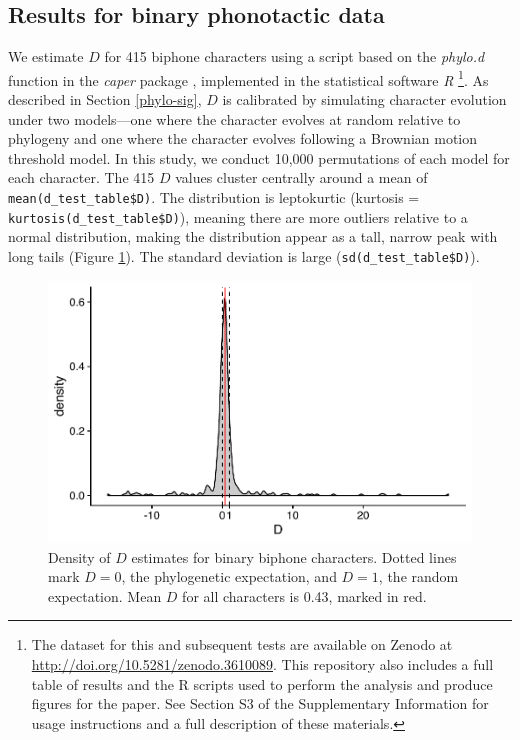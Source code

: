 \hypertarget{phy-sig-bin-results}{%
\subsection{Results for binary phonotactic data}\label{phy-sig-bin-results}}

We estimate \(D\) for 415 biphone characters using a script based on the \emph{phylo.d} function in the \emph{caper} package \autocite{orme_caper:_2013}, implemented in the statistical software \emph{R} \autocite{r_core_team_r:_2017}\footnote{The dataset for this and subsequent tests are available on Zenodo at \url{http://doi.org/10.5281/zenodo.3610089}. This repository also includes a full table of results and the R scripts used to perform the analysis and produce figures for the paper. See Section S3 of the Supplementary Information for usage instructions and a full description of these materials.}. As described in Section \ref{phylo-sig}, \(D\) is calibrated by simulating character evolution under two models---one where the character evolves at random relative to phylogeny and one where the character evolves following a Brownian motion threshold model. In this study, we conduct 10,000 permutations of each model for each character. The 415 \(D\) values cluster centrally around a mean of \texttt{mean(d\_test\_table\$D)}. The distribution is leptokurtic (kurtosis = \texttt{kurtosis(d\_test\_table\$D)}), meaning there are more outliers relative to a normal distribution, making the distribution appear as a tall, narrow peak with long tails (Figure \ref{fig:d-density}). The standard deviation is large (\texttt{sd(d\_test\_table\$D)}).

\begin{figure}

{\centering \includegraphics[width=0.66\linewidth]{fig/d-density} 

}

\caption{Density of $D$ estimates for binary biphone characters. Dotted lines mark $D=0$, the phylogenetic expectation, and $D=1$, the random expectation. Mean $D$ for all characters is 0.43, marked in red.}\label{fig:d-density}
\end{figure}

